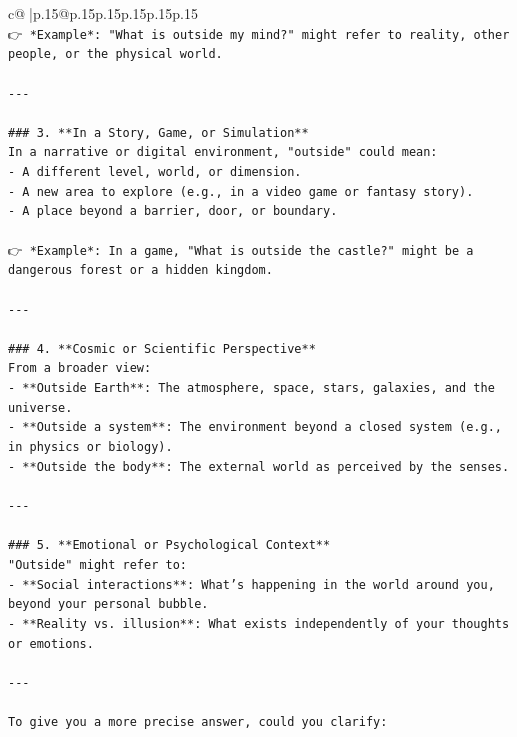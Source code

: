 \documentclass{article}
\begin{document}
{\begin{supertabular}{c@{$\;$}|p{.15\linewidth}@{}p{.15\linewidth}p{.15\linewidth}p{.15\linewidth}p{.15\linewidth}p{.15\linewidth}}
{{{\\ 
\texttt{👉 *Example*: "What is outside my mind?" might refer to reality, other people, or the physical world.} \\
\\ 
\texttt{{-}{-}{-}} \\
\\ 
\texttt{\#\#\# 3. **In a Story, Game, or Simulation**} \\
\texttt{In a narrative or digital environment, "outside" could mean:} \\
\texttt{{-} A different level, world, or dimension.} \\
\texttt{{-} A new area to explore (e.g., in a video game or fantasy story).} \\
\texttt{{-} A place beyond a barrier, door, or boundary.} \\
\\ 
\texttt{👉 *Example*: In a game, "What is outside the castle?" might be a dangerous forest or a hidden kingdom.} \\
\\ 
\texttt{{-}{-}{-}} \\
\\ 
\texttt{\#\#\# 4. **Cosmic or Scientific Perspective**} \\
\texttt{From a broader view:} \\
\texttt{{-} **Outside Earth**: The atmosphere, space, stars, galaxies, and the universe.} \\
\texttt{{-} **Outside a system**: The environment beyond a closed system (e.g., in physics or biology).} \\
\texttt{{-} **Outside the body**: The external world as perceived by the senses.} \\
\\ 
\texttt{{-}{-}{-}} \\
\\ 
\texttt{\#\#\# 5. **Emotional or Psychological Context**} \\
\texttt{"Outside" might refer to:} \\
\texttt{{-} **Social interactions**: What’s happening in the world around you, beyond your personal bubble.} \\
\texttt{{-} **Reality vs. illusion**: What exists independently of your thoughts or emotions.} \\
\\ 
\texttt{{-}{-}{-}} \\
\\ 
\texttt{To give you a more precise answer, could you clarify:} \\
}}}
\end{supertabular}}
\end{document}
